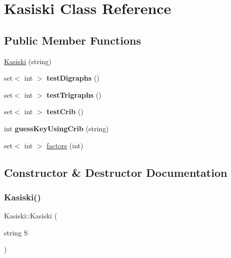 \hypertarget{classKasiski}{}\section{Kasiski Class Reference}
\label{classKasiski}
\subsection*{Public Member Functions}
\begin{DoxyCompactItemize}
\item 
\hyperlink{classKasiski_acdbe405863ad47649cec79084f002206}{Kasiski} (string)
\item 
\mbox{\label{classKasiski_a9c17dc2140312977a844de6343fcbe14}} 
set$<$ int $>$ {\bfseries test\+Digraphs} ()
\item 
\mbox{\label{classKasiski_a2780b34c1ac811205aaa968f7358cb59}} 
set$<$ int $>$ {\bfseries test\+Trigraphs} ()
\item 
\mbox{\label{classKasiski_ab02b3f86ce0c8b076f222bb0c86d48ad}} 
set$<$ int $>$ {\bfseries test\+Crib} ()
\item 
\mbox{\label{classKasiski_a10a6c9e944f74c6400738874fa3e0d3b}} 
int {\bfseries guess\+Key\+Using\+Crib} (string)
\item 
set$<$ int $>$ \hyperlink{classKasiski_a82de87eb81569e3d8d595560fa73ee6a}{factors} (int)
\end{DoxyCompactItemize}


\subsection{Constructor \& Destructor Documentation}
\mbox{\label{classKasiski_acdbe405863ad47649cec79084f002206}} 
\subsubsection{\texorpdfstring{Kasiski()}{Kasiski()}}
{\footnotesize\ttfamily Kasiski\+::\+Kasiski (\begin{DoxyParamCaption}\item[{string}]{S }\end{DoxyParamCaption})}

